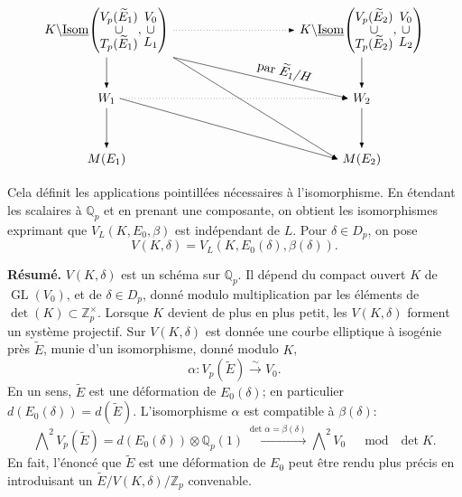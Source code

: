 \documentclass[11pt]{article}
\newcommand{\Qp}{\mathbb{Q}_{p}}
\newcommand{\Zp}{\mathbb{Z}_{p}}
\newcommand{\GL}{\operatorname{GL}}
\newcommand{\wt}{\widetilde}
\begin{document}
\[
\begin{tikzpicture}[x=1cm,y=1cm,>=Latex,baseline=(current bounding box.center)]
  \node (A) at (0,3.15) {$K\backslash\underline{\operatorname{Isom}}\!\left(\begin{matrix}V_p(\widetilde E_1)\\[-2pt]\cup\\[-2pt]T_p(\widetilde E_1)\end{matrix},\begin{matrix}V_0\\[-2pt]\cup\\[-2pt]L_1\end{matrix}\right)$};
  \node (B) at (7.1,3.15) {$K\backslash\underline{\operatorname{Isom}}\!\left(\begin{matrix}V_p(\widetilde E_2)\\[-2pt]\cup\\[-2pt]T_p(\widetilde E_2)\end{matrix},\begin{matrix}V_0\\[-2pt]\cup\\[-2pt]L_2\end{matrix}\right)$};
  \node (W1) at (0,1.25) {$W_1$};
  \node (W2) at (7.1,1.25) {$W_2$};
  \node (M1) at (0,-0.45) {$M(E_1)$};
  \node (M2) at (7.1,-0.45) {$M(E_2)$};
  \draw[->] (A) -- (W1);
  \draw[->] (B) -- (W2);
  \draw[->] (W1) -- (M1);
  \draw[->] (W2) -- (M2);
  \draw[dotted,->] (A) -- (B);
  \draw[dotted,->] (W1) -- (W2);
  \draw[->] (A.south east) -- node[pos=.62,above,sloped] {par $\widetilde E_1/H$} (W2.west);
  \draw[->] (A.south east) -- (M2.west);
  \draw[->] (W1.east) -- (M2.west);
\end{tikzpicture}
\]

Cela définit les applications pointillées nécessaires à l'isomorphisme.
En étendant les scalaires à \(\Qp\) et en prenant une composante, on obtient les isomorphismes exprimant que \(V_L(K,E_0,\beta)\) est indépendant de \(L\). Pour \(\delta\in D_p\), on pose
\[
V(K,\delta)=V_L(K,E_0(\delta),\beta(\delta)).
\]

\textbf{Résumé.} \(V(K,\delta)\) est un schéma sur \(\Qp\). Il dépend du compact ouvert \(K\) de \(\GL(V_0)\), et de \(\delta\in D_p\), donné modulo multiplication par les éléments de \(\det(K)\subset\Zp^\times\). Lorsque \(K\) devient de plus en plus petit, les \(V(K,\delta)\) forment un système projectif. Sur \(V(K,\delta)\) est donnée une courbe elliptique à isogénie près \(\wt E\), munie d'un isomorphisme, donné modulo \(K\),
\[
\alpha:V_p(\wt E)\xrightarrow{\sim}V_0.
\]
En un sens, \(\wt E\) est une déformation de \(E_0(\delta)\); en particulier \(d(E_0(\delta))=d(\wt E)\). L'isomorphisme \(\alpha\) est compatible à \(\beta(\delta)\):
\[
\bigwedge\nolimits^2V_p(\wt E)
=d(E_0(\delta))\otimes\Qp(1)
\xrightarrow{\det\alpha=\beta(\delta)}
\bigwedge\nolimits^2V_0
\quad\bmod\ \det K.
\]
En fait, l'énoncé que \(\wt E\) est une déformation de \(E_0\) peut être rendu plus précis en introduisant un \(\wt E/V(K,\delta)/\Zp\) convenable.
\end{document}

